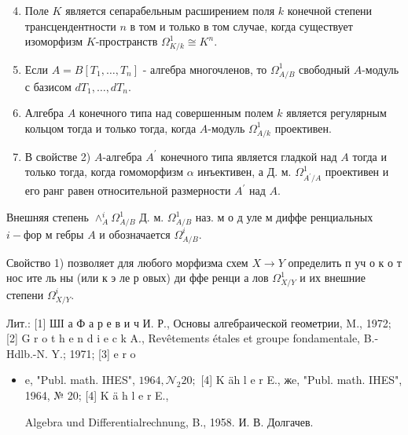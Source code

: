 \documentclass[10pt]{article}
\begin{document}
\begin{enumerate}

  \setcounter{enumi}{3}

  \item Поле $K$ является сепарабельным расширением поля $k$ конечной степени трансцендентности $n$ в том и только в том случае, когда существует изоморфизм $K$-пространств $\Omega_{K / k}^{1} \cong K^{n}$.



  \item Если $A=B\left[T_{1}, \ldots, T_{n}\right]$ - алгебра многочленов, то $\Omega_{A / B}^{1}$ свободный $A$-модуль с базисом $d T_{1}, \ldots, d T_{n}$.



  \item Алгебра $A$ конечного типа над совершенным полем $k$ является регулярным кольцом тогда и только тогда, когда $A$-модуль $\Omega_{A / k}^{1}$ проективен.



  \item В свойстве 2) $A$-алгебра $A^{\prime}$ конечного типа является гладкой над $A$ тогда и только тогда, когда гомоморфизм $\alpha$ инъективен, а Д. м. $\Omega_{A^{\prime} / A}^{1}$ проективен и его ранг равен относительной размерности $A^{\prime}$ над $A$.



\end{enumerate}



Внешняя степень $\wedge_{A}^{i} \Omega_{A / B}^{1}$ Д. м. $\Omega_{A / B}^{1}$ наз. м о д уле м диффе ренциальных $i-ф о р$ м гебры $A$ и обозначается $\Omega_{A / B}^{i}$.



Свойство 1) позволяет для любого морфизма схем $X \rightarrow Y$ определить п уч о к о т нос ите ль ны (или к э ле р овых) ди ффе ренци а лов $\Omega_{X / Y}^{1}$ и их внешние степени $\Omega_{X / Y}^{i}$.



Лит.: [1] ШІ а Ф а р е в и ч И. Р., Основы алгебраической геометрии, M., 1972; [2] G r o t h e n d i e c k A., Revêtements étales et groupe fondamentale, B.-Hdlb.-N. Y.; 1971; [3] e r o



\begin{itemize}

  \item e, "Publ. math. IHES", $1964, \mathcal{N}_{2} 20 ;$ [4] K äh l e r E., жe, "Publ. math. IHES", 1964, № 20; [4] K ä h l e r E.,

Algebra und Differentialrechnung, B., 1958. И. В. Долгачев.

\end{itemize}
\end{document}
